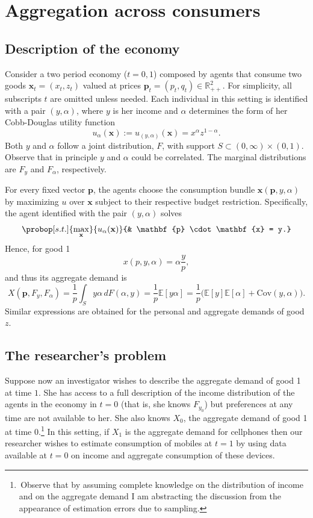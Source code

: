 \documentclass[english, a4paper, 12pt]{article}
\begin{document}
\section{Aggregation across consumers} \label{sec:RepAg}

\subsection{Description of the economy} \label{ssec:RepAgDescr}
Consider a two period economy ($t = 0,1$) composed by agents that consume two goods $\mathbf{x}_{t} = (x_{t}, z_{t})$ valued at prices $\mathbf{p}_{t} = (p_{t}, q_{t}) \in \mathbb{R}^{2}_{++}$. For simplicity, all subscripts $t$ are omitted unless needed. Each individual in this setting is identified with a pair $(y,\alpha)$, where $y$ is her income and $\alpha$ determines the form of her Cobb-Douglas utility function
	$$u_{\alpha}(\mathbf{x}) := u_{(y,\alpha)}(\mathbf{x}) = x^{\alpha}z^{1-\alpha}.$$
Both $y$ and $\alpha$ follow a joint distribution, $F$, with support $S \subset (0,\infty) \times (0,1)$. Observe that in principle $y$ and $\alpha$ could be correlated. The marginal distributions are $F_{y}$ and $F_{\alpha}$, respectively. 

For every fixed vector $\mathbf{p}$, the agents choose the consumption bundle $\mathbf{x}(\mathbf{p}, y, \alpha)$ by maximizing $u$ over $\mathbf{x}$ subject to their respective budget restriction. Specifically, the agent identified with the pair $(y,\alpha)$ solves
	$$\probop[s.t.]{\max_{\mathbf{x}}}{u_{\alpha}(\mathbf{x})}
							{&	\mathbf{p} \cdot \mathbf{x} = y.}$$ 
Hence, for good 1
	$$x(p, y, \alpha) = \alpha \frac{y}{p},$$
and thus its aggregate demand is
	$$X(\mathbf{p}, F_{y}, F_{\alpha})
		= \frac{1}{p} \int_{S} y\alpha \,dF(\alpha,y)
		= \frac{1}{p}\mathbb{E}[y\alpha]
		= \frac{1}{p}\Big(\mathbb{E}[y]\mathbb{E}[\alpha] + \mathrm{Cov}(y,\alpha)\Big).
	$$
Similar expressions are obtained for the personal and aggregate demands of good $z$.

\subsection{The researcher's problem} \label{ssec:RepAgProblem}
Suppose now an investigator wishes to describe the aggregate demand of good 1 at time $1$. She has access to a full description of the income distribution of the agents in the economy in $t = 0$ (that is, she knows $F_{y_{0}}$) but preferences at any time are not available to her. She also knows $X_{0}$, the aggregate demand of good 1 at time $0$.\footnote{\,Observe that by assuming complete knowledge on the distribution of income and on the aggregate demand I am abstracting the discussion from the appearance of estimation errors due to sampling.} In this setting, if $X_{1}$ is the aggregate demand for cellphones then our researcher wishes to estimate consumption of mobiles at $t=1$ by using data available at $t=0$ on income and aggregate consumption of these devices.
\end{document}
